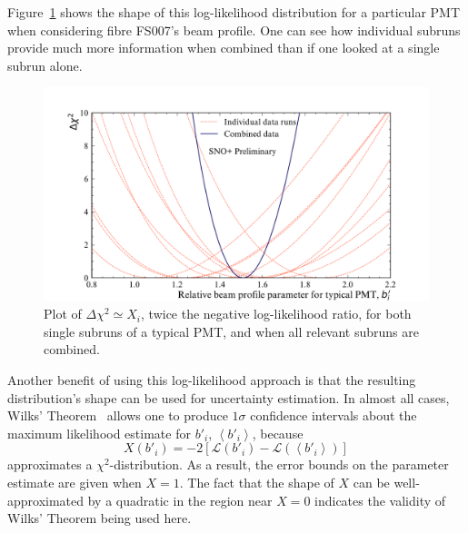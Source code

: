 Figure~\ref{fig:likelihood_scan} shows the shape of this log-likelihood distribution for a particular PMT when considering fibre FS007's beam profile. One can see how individual subruns provide much more information when combined than if one looked at a single subrun alone.

\begin{figure}
    \centering
    \includegraphics[width=0.8\linewidth]{4_SMELLIESimulation/images/example_likelihood_distribution_pmt_inc_all_subruns_proper_formatting.pdf}
    \caption[Plot of $\Delta\chi^2$ for both single subruns of a typical PMT, and when all relevant subruns are combined]{Plot of $\Delta\chi^2\simeq X_{i}$, twice the negative log-likelihood ratio, for both single subruns of a typical PMT, and when all relevant subruns are combined.}
    \label{fig:likelihood_scan}
\end{figure}

Another benefit of using this log-likelihood approach is that the resulting distribution's shape can be used for uncertainty estimation. In almost all cases, Wilks' Theorem~\cite{wilksLargeSampleDistributionLikelihood1938} allows one to produce $1 \sigma$ confidence intervals about the maximum likelihood estimate for $b'_{i}$, $\left<b'_{i}\right>$, because $$X(b'_{i}) = -2\left[\mathcal{L}\left(b'_{i}\right) - \mathcal{L}\left(\left<b'_{i}\right>\right)\right]$$ approximates a $\chi^2$-distribution. As a result, the error bounds on the parameter estimate are given when $X = 1$. The fact that the shape of $X$ can be well-approximated by a quadratic in the region near $X = 0$ indicates the validity of Wilks' Theorem being used here.

